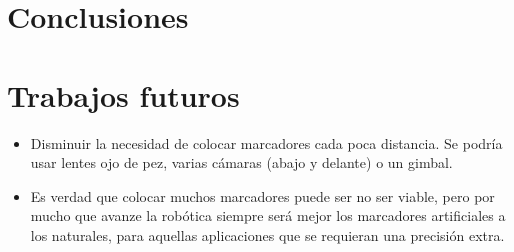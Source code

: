 \chapter{Conclusiones} \label{chp-conclusiones}

\chapter{Trabajos futuros}

\begin{itemize}
\item Disminuir la necesidad de colocar marcadores cada poca distancia. Se podría usar lentes ojo de pez, varias cámaras (abajo y delante) o un gimbal.  
\item Es verdad que colocar muchos marcadores puede ser no ser viable, pero por mucho que avanze la robótica siempre será mejor los marcadores artificiales a los naturales, para aquellas aplicaciones que se requieran una precisión extra.
\end{itemize}

\endinput
